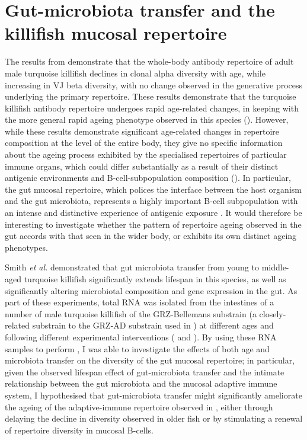 \FloatBarrier
\clearpage

\section{Gut-microbiota transfer and the killifish mucosal repertoire}
\label{sec:igseq_gut}

The results from  demonstrate that the whole-body antibody repertoire of adult male turquoise killifish declines in clonal alpha diversity with age, while increasing in VJ beta diversity, with no change observed in the generative process underlying the primary repertoire. These results demonstrate that the turquoise killifish antibody repertoire undergoes rapid age-related changes, in keeping with the more general rapid ageing phenotype observed in this species (). However, while these results demonstrate significant age-related changes in repertoire composition at the level of the entire body, they give no specific information about the ageing process exhibited by the specialised repertoires of particular immune organs, which could differ substantially as a result of their distinct antigenic environments and B-cell-subpopulation composition (). In particular, the gut mucosal repertoire, which polices the interface between the host organism and the gut microbiota, represents a highly important B-cell subpopulation with an intense and distinctive experience of antigenic exposure \parencite{spencer2016intestinal}. It would therefore be interesting to investigate whether the pattern of repertoire ageing observed in the gut accords with that seen in the wider body, or exhibits its own distinct ageing phenotypes.

Smith \textit{et al.} \parencite{smith2017microbiota} demonstrated that gut microbiota transfer from young to middle-aged turquoise killifish significantly extends lifespan in this species, as well as significantly altering microbiotal composition and gene expression in the gut. As part of these experiments, total RNA was isolated from the intestines of a number of male turquoise killifish of the GRZ-Bellemans substrain (a closely-related substrain to the GRZ-AD substrain used in ) at different ages and following different experimental interventions ( and ). By using these RNA samples to perform \Igseq, I was able to investigate the effects of both age and microbiota transfer on the diversity of the gut mucosal repertoire; in particular, given the observed lifespan effect of gut-microbiota transfer and the intimate relationship between the gut microbiota and the mucosal adaptive immune system, I hypothesised that gut-microbiota transfer might significantly ameliorate the ageing of the adaptive-immune repertoire observed in , either through delaying the decline in diversity observed in older fish or by stimulating a renewal of repertoire diversity in mucosal B-cells.

